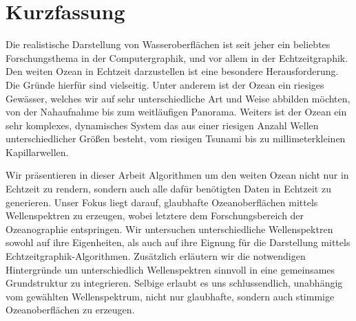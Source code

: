\chapter*{Kurzfassung}


Die realistische Darstellung von Wasseroberflächen ist seit jeher ein beliebtes Forschungsthema in der Computergraphik, und vor allem in
der Echtzeitgraphik. Den weiten Ozean in Echtzeit darzustellen ist
eine besondere Herausforderung. Die Gründe hierfür sind vielseitig.
Unter anderem ist der Ozean ein riesiges Gewässer, welches wir auf
sehr unterschiedliche Art und Weise abbilden möchten, von der Nahaufnahme
bis zum weitläufigen Panorama.
Weiters ist der Ozean ein sehr komplexes, dynamisches System das aus
einer riesigen Anzahl Wellen unterschiedlicher Größen besteht, vom
riesigen Tsunami bis zu millimeterkleinen Kapillarwellen.

Wir präsentieren in dieser Arbeit Algorithmen um den weiten Ozean
nicht nur in Echtzeit zu rendern, sondern auch alle dafür benötigten
Daten in Echtzeit zu generieren. Unser Fokus liegt darauf, glaubhafte
Ozeanoberflächen mittels Wellenspektren zu erzeugen, wobei letztere dem Forschungsbereich der Ozeanographie entspringen.
Wir untersuchen unterschiedliche Wellenspektren sowohl auf ihre
Eigenheiten, als auch auf ihre Eignung für die Darstellung mittels Echtzeitgraphik-Algorithmen. Zusätzlich erläutern wir
die notwendigen Hintergründe um unterschiedlich Wellenspektren sinnvoll
in eine gemeinsames Grundstruktur zu integrieren. Selbige erlaubt es uns
schlussendlich, unabhängig vom gewählten Wellenspektrum, nicht nur glaubhafte, sondern auch stimmige Ozeanoberflächen zu erzeugen.
 
